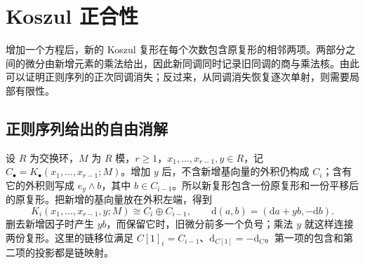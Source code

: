 
\section{Koszul 正合性}
\label{b3:sec:1503}

增加一个方程后，新的 Koszul 复形在每个次数包含原复形的相邻两项。两部分之间的微分由新增元素的乘法给出，因此新同调同时记录旧同调的商与乘法核。由此可以证明正则序列的正次同调消失；反过来，从同调消失恢复逐次单射，则需要局部有限性。


%
%

\subsection{正则序列给出的自由消解}
\label{b3:subsec:1503:01}

设 \(R\) 为交换环，\(M\) 为 \(R\) 模，\(r\ge1\)，\(x_1,\ldots,x_{r-1},y\in R\)，记 \(C_\bullet=K_\bullet(x_1,\ldots,x_{r-1};M)\)。增加 \(y\) 后，不含新增基向量的外积仍构成 \(C_i\)；含有它的外积则写成 \(e_y\wedge b\)，其中 \(b\in C_{i-1}\)。所以新复形包含一份原复形和一份平移后的原复形。把新增的基向量放在外积左端，得到
\[
	K_i(x_1,\ldots,x_{r-1},y;M)\cong C_i\oplus C_{i-1}, \qquad \mathrm{d}(a,b)=(\mathrm{d}a+yb,-\mathrm{d}b).
\]
删去新增因子时产生 \(yb\)，而保留它时，旧微分前多一个负号；乘法 \(y\) 就这样连接两份复形。这里的链移位满足 \(C[1]_i=C_{i-1}\)、\(\mathrm{d}_{C[1]}=-\mathrm{d}_C\)。第一项的包含和第二项的投影都是链映射。

